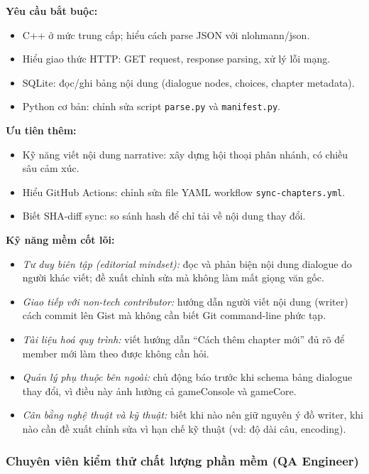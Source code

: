 \documentclass[12pt,a4paper]{article}
\begin{document}
\noindent\textbf{Yêu cầu bắt buộc:}
\begin{itemize}[nosep]
    \item C++ ở mức trung cấp; hiểu cách parse JSON với nlohmann/json.
    \item Hiểu giao thức HTTP: GET request, response parsing, xử lý lỗi mạng.
    \item SQLite: đọc/ghi bảng nội dung (dialogue nodes, choices, chapter metadata).
    \item Python cơ bản: chỉnh sửa script \texttt{parse.py} và \texttt{manifest.py}.
\end{itemize}

\noindent\textbf{Ưu tiên thêm:}
\begin{itemize}[nosep]
    \item Kỹ năng viết nội dung narrative: xây dựng hội thoại phân nhánh, có chiều sâu cảm xúc.
    \item Hiểu GitHub Actions: chỉnh sửa file YAML workflow \texttt{sync-chapters.yml}.
    \item Biết SHA-diff sync: so sánh hash để chỉ tải về nội dung thay đổi.
\end{itemize}

\noindent\textbf{Kỹ năng mềm cốt lõi:}
\begin{itemize}[nosep]
    \item \textit{Tư duy biên tập (editorial mindset):} đọc và phản biện nội dung dialogue
          do người khác viết; đề xuất chỉnh sửa mà không làm mất giọng văn gốc.
    \item \textit{Giao tiếp với non-tech contributor:} hướng dẫn người viết nội dung
          (writer) cách commit lên Gist mà không cần biết Git command-line phức tạp.
    \item \textit{Tài liệu hoá quy trình:} viết hướng dẫn ``Cách thêm chapter mới'' đủ rõ
          để member mới làm theo được không cần hỏi.
    \item \textit{Quản lý phụ thuộc bên ngoài:} chủ động báo trước khi schema bảng dialogue
          thay đổi, vì điều này ảnh hưởng cả gameConsole và gameCore.
    \item \textit{Cân bằng nghệ thuật và kỹ thuật:} biết khi nào nên giữ nguyên ý đồ writer,
          khi nào cần đề xuất chỉnh sửa vì hạn chế kỹ thuật (vd: độ dài câu, encoding).
\end{itemize}

\subsubsection{Chuyên viên kiểm thử chất lượng phần mềm (QA Engineer)}
\end{document}
